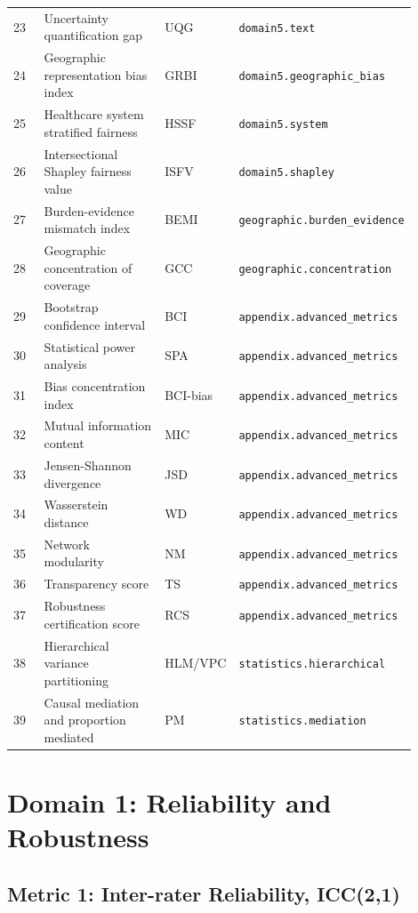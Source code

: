 \documentclass[11pt]{article}
\begin{document}
\begin{longtable}{p{0.08\linewidth}p{0.32\linewidth}p{0.18\linewidth}p{0.32\linewidth}}
23 & Uncertainty quantification gap & UQG & \texttt{domain5.text} \\
24 & Geographic representation bias index & GRBI & \texttt{domain5.geographic\_bias} \\
25 & Healthcare system stratified fairness & HSSF & \texttt{domain5.system} \\
26 & Intersectional Shapley fairness value & ISFV & \texttt{domain5.shapley} \\
27 & Burden-evidence mismatch index & BEMI & \texttt{geographic.burden\_evidence} \\
28 & Geographic concentration of coverage & GCC & \texttt{geographic.concentration} \\
29 & Bootstrap confidence interval & BCI & \texttt{appendix.advanced\_metrics} \\
30 & Statistical power analysis & SPA & \texttt{appendix.advanced\_metrics} \\
31 & Bias concentration index & BCI-bias & \texttt{appendix.advanced\_metrics} \\
32 & Mutual information content & MIC & \texttt{appendix.advanced\_metrics} \\
33 & Jensen-Shannon divergence & JSD & \texttt{appendix.advanced\_metrics} \\
34 & Wasserstein distance & WD & \texttt{appendix.advanced\_metrics} \\
35 & Network modularity & NM & \texttt{appendix.advanced\_metrics} \\
36 & Transparency score & TS & \texttt{appendix.advanced\_metrics} \\
37 & Robustness certification score & RCS & \texttt{appendix.advanced\_metrics} \\
38 & Hierarchical variance partitioning & HLM/VPC & \texttt{statistics.hierarchical} \\
39 & Causal mediation and proportion mediated & PM & \texttt{statistics.mediation} \\
\bottomrule
\end{longtable}

\section{Domain 1: Reliability and Robustness}

\subsection{Metric 1: Inter-rater Reliability, ICC(2,1)}
\end{document}
